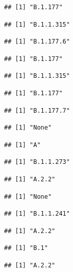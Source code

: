 \documentclass[
]{article}
\begin{document}
\begin{verbatim}
## [1] "B.1.177"
\end{verbatim}

\begin{verbatim}
## [1] "B.1.1.315"
\end{verbatim}

\begin{verbatim}
## [1] "B.1.177.6"
\end{verbatim}

\begin{verbatim}
## [1] "B.1.177"
\end{verbatim}

\begin{verbatim}
## [1] "B.1.1.315"
\end{verbatim}

\begin{verbatim}
## [1] "B.1.177"
\end{verbatim}

\begin{verbatim}
## [1] "B.1.177.7"
\end{verbatim}

\begin{verbatim}
## [1] "None"
\end{verbatim}

\begin{verbatim}
## [1] "A"
\end{verbatim}

\begin{verbatim}
## [1] "B.1.1.273"
\end{verbatim}

\begin{verbatim}
## [1] "A.2.2"
\end{verbatim}

\begin{verbatim}
## [1] "None"
\end{verbatim}

\begin{verbatim}
## [1] "B.1.1.241"
\end{verbatim}

\begin{verbatim}
## [1] "A.2.2"
\end{verbatim}

\begin{verbatim}
## [1] "B.1"
\end{verbatim}

\begin{verbatim}
## [1] "A.2.2"
\end{verbatim}
\end{document}
